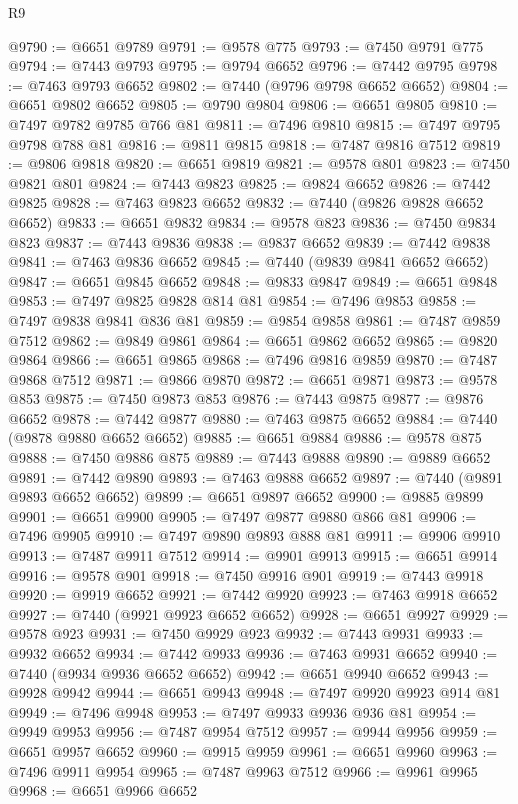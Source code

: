 \begin{lexlean}{R9}
\begin{coremodule}
@9790 := @6651 @9789
@9791 := @9578 @775
@9793 := @7450 @9791 @775
@9794 := @7443 @9793
@9795 := @9794 @6652
@9796 := @7442 @9795
@9798 := @7463 @9793 @6652
@9802 := @7440 (@9796 @9798 @6652 @6652)
@9804 := @6651 @9802 @6652
@9805 := @9790 @9804
@9806 := @6651 @9805
@9810 := @7497 @9782 @9785 @766 @81
@9811 := @7496 @9810
@9815 := @7497 @9795 @9798 @788 @81
@9816 := @9811 @9815
@9818 := @7487 @9816 @7512
@9819 := @9806 @9818
@9820 := @6651 @9819
@9821 := @9578 @801
@9823 := @7450 @9821 @801
@9824 := @7443 @9823
@9825 := @9824 @6652
@9826 := @7442 @9825
@9828 := @7463 @9823 @6652
@9832 := @7440 (@9826 @9828 @6652 @6652)
@9833 := @6651 @9832
@9834 := @9578 @823
@9836 := @7450 @9834 @823
@9837 := @7443 @9836
@9838 := @9837 @6652
@9839 := @7442 @9838
@9841 := @7463 @9836 @6652
@9845 := @7440 (@9839 @9841 @6652 @6652)
@9847 := @6651 @9845 @6652
@9848 := @9833 @9847
@9849 := @6651 @9848
@9853 := @7497 @9825 @9828 @814 @81
@9854 := @7496 @9853
@9858 := @7497 @9838 @9841 @836 @81
@9859 := @9854 @9858
@9861 := @7487 @9859 @7512
@9862 := @9849 @9861
@9864 := @6651 @9862 @6652
@9865 := @9820 @9864
@9866 := @6651 @9865
@9868 := @7496 @9816 @9859
@9870 := @7487 @9868 @7512
@9871 := @9866 @9870
@9872 := @6651 @9871
@9873 := @9578 @853
@9875 := @7450 @9873 @853
@9876 := @7443 @9875
@9877 := @9876 @6652
@9878 := @7442 @9877
@9880 := @7463 @9875 @6652
@9884 := @7440 (@9878 @9880 @6652 @6652)
@9885 := @6651 @9884
@9886 := @9578 @875
@9888 := @7450 @9886 @875
@9889 := @7443 @9888
@9890 := @9889 @6652
@9891 := @7442 @9890
@9893 := @7463 @9888 @6652
@9897 := @7440 (@9891 @9893 @6652 @6652)
@9899 := @6651 @9897 @6652
@9900 := @9885 @9899
@9901 := @6651 @9900
@9905 := @7497 @9877 @9880 @866 @81
@9906 := @7496 @9905
@9910 := @7497 @9890 @9893 @888 @81
@9911 := @9906 @9910
@9913 := @7487 @9911 @7512
@9914 := @9901 @9913
@9915 := @6651 @9914
@9916 := @9578 @901
@9918 := @7450 @9916 @901
@9919 := @7443 @9918
@9920 := @9919 @6652
@9921 := @7442 @9920
@9923 := @7463 @9918 @6652
@9927 := @7440 (@9921 @9923 @6652 @6652)
@9928 := @6651 @9927
@9929 := @9578 @923
@9931 := @7450 @9929 @923
@9932 := @7443 @9931
@9933 := @9932 @6652
@9934 := @7442 @9933
@9936 := @7463 @9931 @6652
@9940 := @7440 (@9934 @9936 @6652 @6652)
@9942 := @6651 @9940 @6652
@9943 := @9928 @9942
@9944 := @6651 @9943
@9948 := @7497 @9920 @9923 @914 @81
@9949 := @7496 @9948
@9953 := @7497 @9933 @9936 @936 @81
@9954 := @9949 @9953
@9956 := @7487 @9954 @7512
@9957 := @9944 @9956
@9959 := @6651 @9957 @6652
@9960 := @9915 @9959
@9961 := @6651 @9960
@9963 := @7496 @9911 @9954
@9965 := @7487 @9963 @7512
@9966 := @9961 @9965
@9968 := @6651 @9966 @6652

\end{coremodule}
\end{lexlean}
